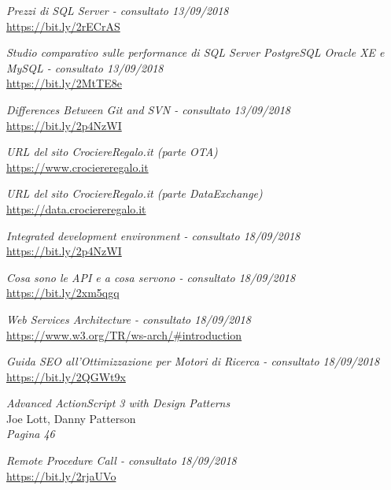 
\cleardoublepage
\begin{thebibliography}{99}
	\textit{Prezzi di SQL Server - consultato 13/09/2018}\\
	\url{https://bit.ly/2rECrAS}
	
	\textit{Studio comparativo sulle performance di SQL Server PostgreSQL Oracle XE e MySQL - consultato 13/09/2018}\\
	\url{https://bit.ly/2MtTE8e}
		
	\textit{Differences Between Git and SVN  - consultato 13/09/2018}\\
	\url{https://bit.ly/2p4NzWI}

	\textit{URL del sito CrociereRegalo.it (parte OTA)}\\
	\url{https://www.crociereregalo.it}
	
	\textit{URL del sito CrociereRegalo.it (parte DataExchange)}\\
	\url{https://data.crociereregalo.it}
	
	\textit{Integrated development environment - consultato 18/09/2018}\\
	\url{https://bit.ly/2p4NzWI}

	\textit{Cosa sono le API e a cosa servono - consultato 18/09/2018}\\
	\url{https://bit.ly/2xm5qgq}

	\textit{Web Services Architecture - consultato 18/09/2018}\\
	\url{https://www.w3.org/TR/ws-arch/\#introduction}

	\textit{Guida SEO all’Ottimizzazione per Motori di Ricerca - consultato 18/09/2018}\\
	\url{https://bit.ly/2QGWt9x}
	
	\textit{Advanced ActionScript 3 with Design Patterns}\\
	Joe Lott, Danny Patterson\\
	\textit{Pagina 46}

	\textit{Remote Procedure Call - consultato 18/09/2018}\\
	\url{https://bit.ly/2rjaUVo}


\end{thebibliography}
